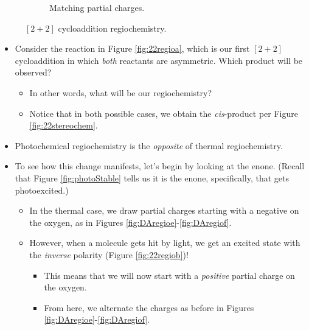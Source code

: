 \documentclass[../notes.tex]{subfiles}
\begin{document}
\begin{itemize}
\begin{figure}[H]
        \begin{subfigure}[b]{0.33\linewidth}
            \centering
            \caption{Matching partial charges.}
            \label{fig:22regiod}
        \end{subfigure}
        \caption{$[2+2]$ cycloaddition regiochemistry.}
        \label{fig:22regio}
    \end{figure}
    \begin{itemize}
        \item Consider the reaction in Figure \ref{fig:22regioa}, which is our first $[2+2]$ cycloaddition in which \emph{both} reactants are asymmetric. Which product will be observed?
        \begin{itemize}
            \item In other words, what will be our regiochemistry?
            \item Notice that in both possible cases, we obtain the \emph{cis}-product per Figure \ref{fig:22stereochem}.
        \end{itemize}
        \item Photochemical regiochemistry is the \emph{opposite} of thermal regiochemistry.
        \item To see how this change manifests, let's begin by looking at the enone. (Recall that Figure \ref{fig:photoStable} tells us it is the enone, specifically, that gets photoexcited.)
        \begin{itemize}
            \item In the thermal case, we draw partial charges starting with a negative on the oxygen, as in Figures \ref{fig:DAregioe}-\ref{fig:DAregiof}.
            \item However, when a molecule gets hit by light, we get an excited state with the \emph{inverse} polarity (Figure \ref{fig:22regiob})!
            \begin{itemize}
                \item This means that we will now start with a \emph{positive} partial charge on the oxygen.
                \item From here, we alternate the charges as before in Figures \ref{fig:DAregioe}-\ref{fig:DAregiof}.

\end{itemize}
\end{itemize}
\end{itemize}
\end{itemize}
\end{document}
